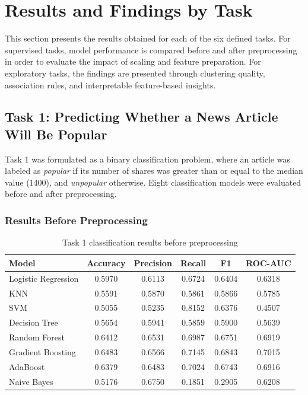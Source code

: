 \section{Results and Findings by Task}

This section presents the results obtained for each of the six defined tasks. For supervised
tasks, model performance is compared before and after preprocessing in order to evaluate the
impact of scaling and feature preparation. For exploratory tasks, the findings are presented
through clustering quality, association rules, and interpretable feature-based insights.

\subsection{Task 1: Predicting Whether a News Article Will Be Popular}

Task 1 was formulated as a binary classification problem, where an article was labeled as
\textit{popular} if its number of shares was greater than or equal to the median value
(1400), and \textit{unpopular} otherwise. Eight classification models were evaluated before and
after preprocessing.

\subsubsection*{Results Before Preprocessing}

\begin{table}[H]
\centering
\caption{Task 1 classification results before preprocessing}
\begin{tabular}{lccccc}
\toprule
Model & Accuracy & Precision & Recall & F1 & ROC-AUC \\
\midrule
Logistic Regression & 0.5970 & 0.6113 & 0.6724 & 0.6404 & 0.6318 \\
KNN & 0.5591 & 0.5870 & 0.5861 & 0.5866 & 0.5785 \\
SVM & 0.5055 & 0.5235 & 0.8152 & 0.6376 & 0.4507 \\
Decision Tree & 0.5654 & 0.5941 & 0.5859 & 0.5900 & 0.5639 \\
Random Forest & 0.6412 & 0.6531 & 0.6987 & 0.6751 & 0.6919 \\
Gradient Boosting & 0.6483 & 0.6566 & 0.7145 & 0.6843 & 0.7015 \\
AdaBoost & 0.6379 & 0.6483 & 0.7024 & 0.6743 & 0.6916 \\
Naive Bayes & 0.5176 & 0.6750 & 0.1851 & 0.2905 & 0.6208 \\
\bottomrule
\end{tabular}
\end{table}

